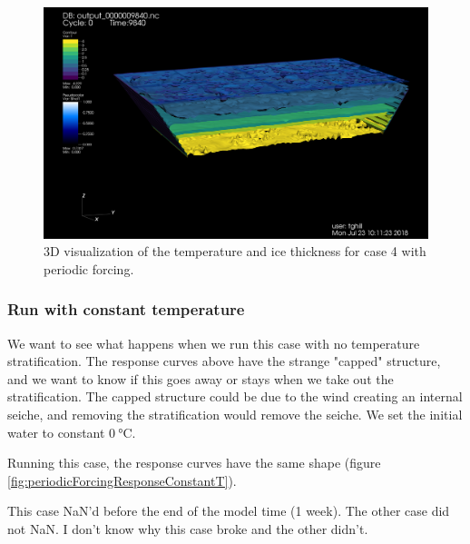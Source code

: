 \documentclass[11pt]{article}
\begin{document}
\begin{figure}[h!]
\includegraphics[width=\linewidth]{periodicForcing/domain-results}
\caption{3D visualization of the temperature and ice thickness for case 4 with periodic forcing.}
\label{fig:periodicVisualization}
\end{figure}

\subsubsection{Run with constant temperature}
We want to see what happens when we run this case with no temperature stratification. The response curves above have the strange "capped" structure, and we want to know if this goes away or stays when we take out the stratification. The capped structure could be due to the wind creating an internal seiche, and removing the stratification would remove the seiche. We set the initial water to constant $\SI{0}{\celsius}$.

Running this case, the response curves have the same shape (figure \ref{fig:periodicForcingResponseConstantT}).

This case NaN'd before the end of the model time (1 week). The other case did not NaN. I don't know why this case broke and the other didn't.
\end{document}
